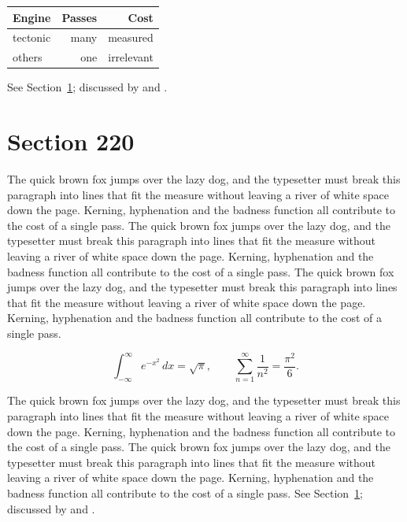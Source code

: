 \documentclass{article}
\begin{document}
\begin{center}
\begin{tabular}{lrr}
\toprule
Engine & Passes & Cost \\
\midrule
tectonic & many & measured \\
others & one & irrelevant \\
\bottomrule
\end{tabular}
\end{center}

See Section~\ref{sec:220}; discussed by \textcite{k5} and \textcite{l2}.
\section{Section 220}
\label{sec:220}
The quick brown fox jumps over the lazy dog, and the typesetter must break this paragraph into lines that fit the measure without leaving a river of white space down the page. Kerning, hyphenation and the badness function all contribute to the cost of a single pass. The quick brown fox jumps over the lazy dog, and the typesetter must break this paragraph into lines that fit the measure without leaving a river of white space down the page. Kerning, hyphenation and the badness function all contribute to the cost of a single pass. The quick brown fox jumps over the lazy dog, and the typesetter must break this paragraph into lines that fit the measure without leaving a river of white space down the page. Kerning, hyphenation and the badness function all contribute to the cost of a single pass. 

\begin{equation}\label{eq:220}
\int_{-\infty}^{\infty} e^{-x^{2}}\,dx = \sqrt{\pi}, \qquad
\sum_{n=1}^{\infty} \frac{1}{n^{2}} = \frac{\pi^{2}}{6}.
\end{equation}

The quick brown fox jumps over the lazy dog, and the typesetter must break this paragraph into lines that fit the measure without leaving a river of white space down the page. Kerning, hyphenation and the badness function all contribute to the cost of a single pass. The quick brown fox jumps over the lazy dog, and the typesetter must break this paragraph into lines that fit the measure without leaving a river of white space down the page. Kerning, hyphenation and the badness function all contribute to the cost of a single pass. 
See Section~\ref{sec:220}; discussed by \textcite{k1} and \textcite{l3}.
\printbibliography
\end{document}

